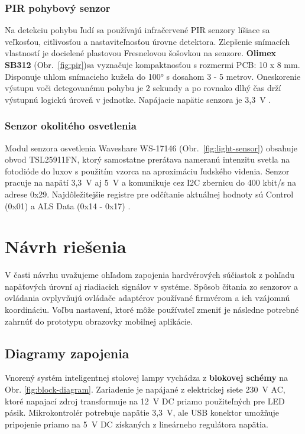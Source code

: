 \documentclass[12pt, a4paper]{article}
\begin{document}
\subsubsection{PIR pohybový senzor}
Na detekciu pohybu ľudí sa používajú infračervené PIR senzory líšiace sa veľkosťou, citlivosťou a nastaviteľnosťou úrovne detektora. Zlepšenie snímacích vlastností je docielené plastovou Fresnelovou šošovkou na senzore. \textbf{Olimex SB312} (Obr.~\ref{fig:pir})sa vyznačuje kompaktnosťou s rozmermi PCB: 10 x 8 mm. Disponuje uhlom snímacieho kužela do 100° s dosahom 3 - 5 metrov. Oneskorenie výstupu voči detegovanému pohybu je 2 sekundy a po rovnako dlhý čas drží výstupnú logickú úroveň v jednotke. Napájacie napätie senzora je 3,3~V \cite{olimex_pir-sb312_nodate}.

\subsubsection{Senzor okolitého osvetlenia}
Modul senzora osvetlenia Waveshare WS-17146 (Obr.~\ref{fig:light-sensor}) obsahuje obvod TSL25911FN, ktorý samostatne prerátava nameranú intenzitu svetla na fotodióde do luxov s použitím vzorca na aproximáciu ľudského videnia. Senzor pracuje na napätí 3,3~V aj 5~V a komunikuje cez I2C zbernicu do 400 kbit/s na adrese 0x29. Najdôležitejšie registre pre odčítanie aktuálnej hodnoty sú Control (0x01) a ALS Data (0x14 - 0x17) \cite{noauthor_tsl25911_nodate}.

\section{Návrh riešenia}
V časti návrhu uvažujeme ohľadom zapojenia hardvérových súčiastok z pohľadu napäťových úrovní aj riadiacich signálov v systéme. Spôsob čítania zo senzorov a ovládania ovplyvňujú ovládače adaptérov používané firmvérom a ich vzájomnú koordináciu. Voľbu nastavení, ktoré môže používateľ zmeniť je následne potrebné zahrnúť do prototypu obrazovky mobilnej aplikácie.

\subsection{Diagramy zapojenia}
Vnorený systém inteligentnej stolovej lampy vychádza z \textbf{blokovej schémy} na Obr. \ref{fig:block-diagram}. Zariadenie je napájané z elektrickej siete 230~V AC, ktoré napajací zdroj transformuje na 12~V DC priamo použiteľných pre LED pásik. Mikrokontrolér potrebuje napätie 3,3~V, ale USB konektor umožňuje pripojenie priamo na 5~V DC získaných z lineárneho regulátora napätia.
\end{document}
